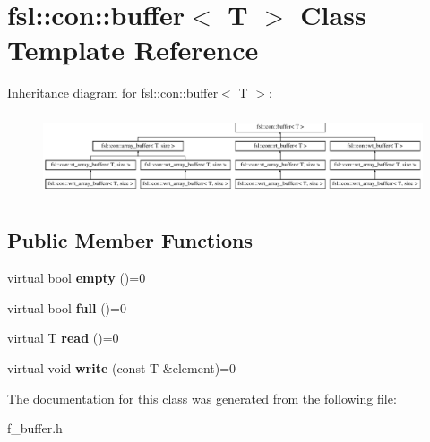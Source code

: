\hypertarget{classfsl_1_1con_1_1buffer}{}\section{fsl\+::con\+::buffer$<$ T $>$ Class Template Reference}
\label{classfsl_1_1con_1_1buffer}
Inheritance diagram for fsl\+::con\+::buffer$<$ T $>$\+:\begin{figure}[H]
\begin{center}
\leavevmode
\includegraphics[height=2.445415cm]{classfsl_1_1con_1_1buffer}
\end{center}
\end{figure}
\subsection*{Public Member Functions}
\begin{DoxyCompactItemize}
\item 
\mbox{\label{classfsl_1_1con_1_1buffer_a05d73a1f752b99cc15e8ea7a024cc6c3}} 
virtual bool {\bfseries empty} ()=0
\item 
\mbox{\label{classfsl_1_1con_1_1buffer_a21a571d59994dc5ed42a71bcb8f40f64}} 
virtual bool {\bfseries full} ()=0
\item 
\mbox{\label{classfsl_1_1con_1_1buffer_a03e74b78d09dac5518c3adc12449d501}} 
virtual T {\bfseries read} ()=0
\item 
\mbox{\label{classfsl_1_1con_1_1buffer_a169254df1f472992e20ac3e7d43e926e}} 
virtual void {\bfseries write} (const T \&element)=0
\end{DoxyCompactItemize}


The documentation for this class was generated from the following file\+:\begin{DoxyCompactItemize}
\item 
f\+\_\+buffer.\+h\end{DoxyCompactItemize}
